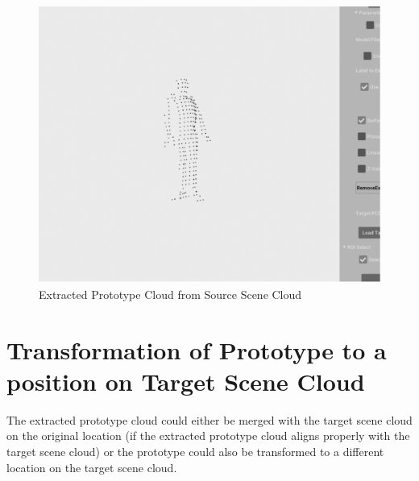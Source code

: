 \begin{figure}[htbp]
    \centering
    \includegraphics[width=0.5\linewidth]{97_graphics/results/prototype_extracted.pdf}
    \caption{Extracted Prototype Cloud from Source Scene Cloud}
    \label{fig:result-prototype_extracted}
\end{figure}

\section{Transformation of Prototype to a position on Target Scene Cloud}
The extracted prototype cloud could either be merged with the target scene cloud on the original location (if the extracted prototype cloud aligns properly with the target scene cloud) or the prototype could also be transformed to a different location on the target scene cloud.


